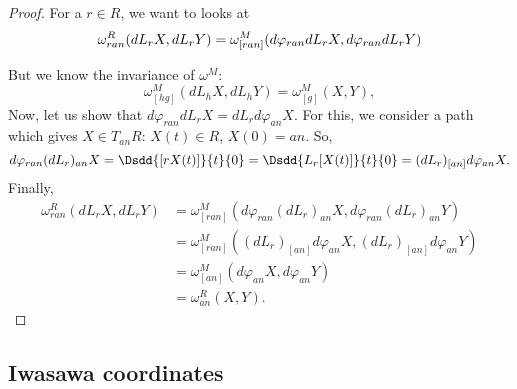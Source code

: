 \begin{proof}
For a $r\in R$, we want to looks at
\begin{equation}
\omega^R_{ran}(dL_rX,dL_rY)=\omega^M_{[ran]}(d\varphi_{ran}dL_rX,d\varphi_{ran}dL_rY)\\                          
\end{equation}

But we know the invariance of $\omega^M$:
\[
  \omega^M_{[hg]}(dL_hX,dL_hY)=\omega^M_{[g]}(X,Y),
\]
Now, let us show that $d\varphi_{ran}dL_rX=dL_rd\varphi_{an}X$. For this, we consider a path which gives $X\in T_{an}R$: $X(t)\in R$, $X(0)=an$. So,
\begin{equation}
  d\varphi_{ran}(dL_r)_{an}X=\Dsdd{[rX(t)]}{t}{0}
                        =\Dsdd{L_r[X(t)]}{t}{0}
			=(dL_r)_{[an]}d\varphi_{an}X.
\end{equation}
Finally,
\begin{equation}
\begin{split}
\omega_{ran}^R(dL_rX,dL_rY)&=\omega^M_{[ran]}(d\varphi_{ran}(dL_r)_{an}X,d\varphi_{ran}(dL_r)_{an}Y)\\
                           &=\omega^M_{[ran]}( (dL_r)_{[an]}d\varphi_{an}X,(dL_r)_{[an]}d\varphi_{an}Y )\\
			   &=\omega^M_{[an]}(d\varphi_{an}X,d\varphi_{an}Y)\\
			   &=\omega^R_{an}(X,Y).
\end{split}
\end{equation}

\end{proof}


\subsection{Iwasawa coordinates}


